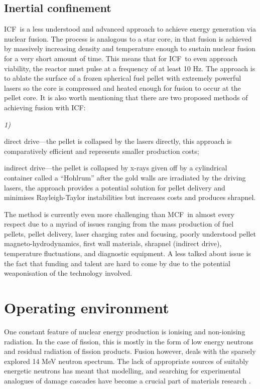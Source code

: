 \documentclass[12pt, a4paper]{article}
\newcommand{\mc}{MCF}
\newcommand{\ic}{ICF}
\begin{document}
		\subsection{Inertial confinement}\label{s:ic}
		\ic~is a less understood and advanced approach to achieve energy generation via nuclear fusion. The process is analogous to a star core, in that fusion is achieved by massively increasing density and temperature enough to sustain nuclear fusion for a very short amount of time. This means that for \ic~to even approach viability, the reactor must pulse at a frequency of at least 10 Hz. The approach is to ablate the surface of a frozen spherical fuel pellet with extremely powerful lasers so the core is compressed and heated enough for fusion to occur at the pellet core. It is also worth mentioning that there are two proposed methods of achieving fusion with \ic:
		\begin{inparaenum}{\itshape1\upshape)}
			\item direct drive---the pellet is collapsed by the lasers directly, this approach is comparatively efficient and represents smaller production costs;
			\item indirect drive---the pellet is collapsed by x-rays given off by a cylindrical container called a ``Hohlrum'' after the gold walls are irradiated by the driving lasers, the approach provides a potential solution for pellet delivery and minimises Rayleigh-Taylor instabilities but increases costs and produces shrapnel.
		\end{inparaenum}
		
		The method is currently even more challenging than \mc~in almost every respect due to a myriad of issues ranging from the mass production of fuel pellets, pellet delivery, laser charging rates and focusing, poorly understood pellet magneto-hydrodynamics, first wall materials, shrapnel (indirect drive), temperature fluctuations, and diagnostic equipment. A less talked about issue is the fact that funding and talent are hard to come by due to the potential weaponisation of the technology involved.
	\section{Operating environment}\label{s:op}
		One constant feature of nuclear energy production is ionising and non-ionising radiation. In the case of fission, this is mostly in the form of low energy neutrons and residual radiation of fission products. Fusion however, deals with the sparsely explored 14 MeV neutron spectrum. The lack of appropriate sources of suitably energetic neutrons has meant that modelling, and searching for experimental analogues of damage cascades have become a crucial part of materials research \cite{model, dpa}.
		
\end{document}
